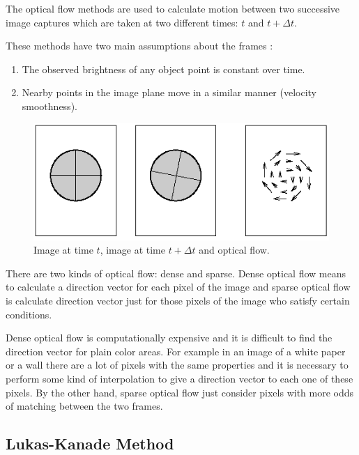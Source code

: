 The optical flow methods are used to calculate motion between two successive image captures which are taken
 at two different times: $t$ and $t + \Delta t$.

These methods have two main assumptions about the frames \cite{sonka2007}:

\begin{enumerate}
\item The observed brightness of any object point is constant over time.
\item Nearby points in the image plane move in a similar manner (velocity smoothness).
\end{enumerate}

\begin{figure}[h!]
\begin{center}
\includegraphics[scale=0.6]{images/oflow}
\caption{Image at time $t$, image at time $t + \Delta t$ and optical flow.}
\label{fig:oflow}
\end{center}
\end{figure}

There are two kinds of optical flow: dense and sparse. Dense optical flow means to calculate a direction vector for each pixel of the image and sparse optical flow is calculate direction vector just for those pixels of the image 
who satisfy certain conditions.

Dense optical flow is computationally expensive and it is difficult to find the direction vector 
for plain color areas. For example in an image of a white paper or a wall
there are a lot of pixels with the same properties and it is necessary to perform some kind of interpolation to give a direction vector
 to each one of these pixels. 
By the other hand, sparse optical flow just consider pixels with more odds of matching between the two frames.

\subsection{Lukas-Kanade Method}
\label{sec:oflow}

